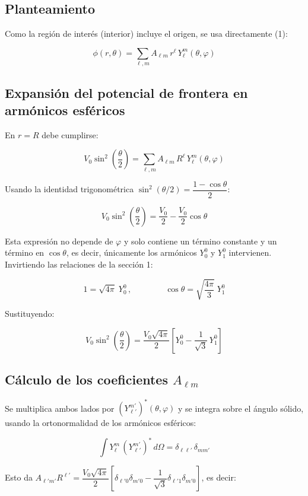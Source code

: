 \documentclass[a4paper]{article}
\begin{document}
\subsection{Planteamiento}


Como la región de interés (interior) incluye el origen, se usa directamente (1):

\[
\phi(r,\theta)=\sum_{\ell,m}A_{\ell m}\,r^{\ell}\,Y_\ell^m(\theta,\varphi)
\]


\subsection{Expansión del potencial de frontera en armónicos esféricos}


En $r=R$ debe cumplirse:

\[
V_0\sin^2\!\left(\frac{\theta}{2}\right)=\sum_{\ell,m}A_{\ell m}\,R^{\ell}\,Y_\ell^m(\theta,\varphi)
\]


Usando la identidad trigonométrica $\sin^2(\theta/2)=\dfrac{1-\cos\theta}{2}$:

\[
V_0\sin^2\!\left(\frac{\theta}{2}\right)=\frac{V_0}{2}-\frac{V_0}{2}\cos\theta
\]


Esta expresión no depende de $\varphi$ y solo contiene un término constante y un término en $\cos\theta$, es decir, únicamente los armónicos $Y_0^0$ y $Y_1^0$ intervienen. Invirtiendo las relaciones de la sección 1:

\[
1=\sqrt{4\pi}\;Y_0^0\,,\qquad\qquad \cos\theta=\sqrt{\frac{4\pi}{3}}\;Y_1^0
\]


Sustituyendo:

\[
V_0\sin^2\!\left(\frac{\theta}{2}\right)=\frac{V_0\sqrt{4\pi}}{2}\left[Y_0^0-\frac{1}{\sqrt3}\,Y_1^0\right]
\]


\subsection{\texorpdfstring{Cálculo de los coeficientes $A_{\ell m}$}{Cálculo de los coeficientes A lm}}


Se multiplica ambos lados por $(Y_{\ell'}^{m'})^*(\theta,\varphi)$ y se integra sobre el ángulo sólido, usando la ortonormalidad de los armónicos esféricos:

\[
\int Y_\ell^m\,(Y_{\ell'}^{m'})^*\,d\Omega=\delta_{\ell\ell'}\,\delta_{mm'}
\]


Esto da $A_{\ell'm'}R^{\ell'}=\dfrac{V_0\sqrt{4\pi}}{2}\left[\delta_{\ell'0}\delta_{m'0}-\dfrac{1}{\sqrt3}\delta_{\ell'1}\delta_{m'0}\right]$, es decir:
\end{document}
